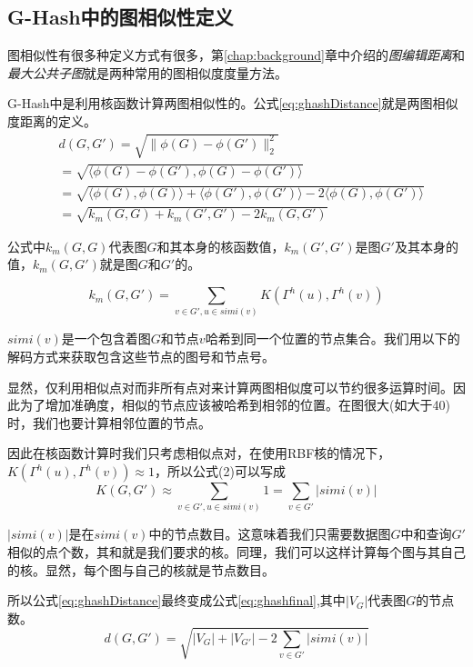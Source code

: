 \documentclass{XDBAthesis}
\begin{document}
\subsection{G-Hash中的图相似性定义}
图相似性有很多种定义方式有很多，第\ref{chap:background}章中介绍的\emph{图编辑距离}和\emph{最大公共子图}就是两种常用的图相似度度量方法。

G-Hash中是利用核函数计算两图相似性的。公式\eqref{eq:ghashDistance}就是两图相似度距离的定义。
\begin{equation}
\begin{split}
    &d(G,G')=\sqrt{\|\phi(G)-\phi(G')\|_{2}^{2}}\\
              &=\sqrt{\langle\phi(G)-\phi(G'),\phi(G)-\phi(G')\rangle}\\
              &=\sqrt{\langle\phi(G),\phi(G)\rangle+\langle\phi(G'),\phi(G')\rangle-2\langle\phi(G),\phi(G')\rangle}\\
              &=\sqrt{k_{m}(G,G)+k_{m}(G',G')-2k_{m}(G,G')}
\end{split}
\label{eq:ghashDistance}
\end{equation}

公式中$k_{m}(G,G)$代表图$G$和其本身的核函数值，$k_{m}(G',G')$是图$G'$及其本身的值，$k_{m}(G,G')$就是图$G$和$G'$的。

\begin{equation}
k_{m}(G,G')=\sum_{v\in G',u\in simi(v)}K(\Gamma^{h}(u),\Gamma^{h}(v))
\end{equation}

$simi(v)$是一个包含着图$G$和节点$v$哈希到同一个位置的节点集合。我们用以下的解码方式来获取包含这些节点的图号和节点号。

显然，仅利用相似点对而非所有点对来计算两图相似度可以节约很多运算时间。因此为了增加准确度，相似的节点应该被哈希到相邻的位置。在图很大(如大于40)时，我们也要计算相邻位置的节点。

因此在核函数计算时我们只考虑相似点对，在使用RBF核的情况下，$K(\Gamma^{h}(u),\Gamma^{h}(v))\approx1$，所以公式(2)可以写成
\begin{equation}
    K(G,G')\approx\sum_{v\in G',u\in simi(v)}1=\sum_{v\in G'}|simi(v)| 
\end{equation}

$|simi(v)|$是在$simi(v)$中的节点数目。这意味着我们只需要数据图$G$中和查询$G'$相似的点个数，其和就是我们要求的核。同理，我们可以这样计算每个图与其自己的核。显然，每个图与自己的核就是节点数目。

所以公式\eqref{eq:ghashDistance}最终变成公式\eqref{eq:ghashfinal},其中$|V_{G}|$代表图$G$的节点数。
\begin{equation}
    d(G,G')=\sqrt{|V_{G}|+|V_{G'}| -2\sum_{v\in G'}|simi(v)| }
    \label{eq:ghashfinal}
\end{equation}
\end{document}
